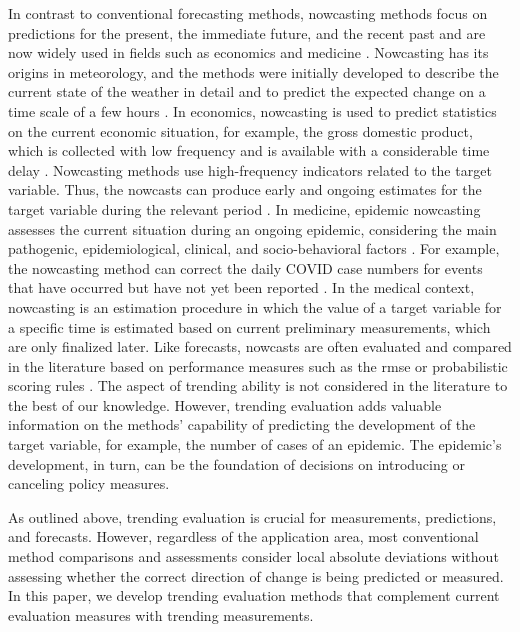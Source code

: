In contrast to conventional forecasting methods, nowcasting methods focus on predictions for the present, the immediate future, and the recent past \parencite{banbura2013now} and are now widely used in fields such as economics and medicine \parencite{bok2018macroeconomic, Wolffram2023}.
Nowcasting has its origins in meteorology, and the methods were initially developed to describe the current state of the weather in detail and to predict the expected change on a time scale of a few hours \parencite{browning1989nowcasting,schmid2019nowcasting}. 
In economics, nowcasting is used to predict statistics on the current economic situation, for example, the gross domestic product, which is collected with low frequency and is available with a considerable time delay \parencite{banbura2013now}.
Nowcasting methods use high-frequency indicators related to the target variable.
Thus, the nowcasts can produce early and ongoing estimates for the target variable during the relevant period \parencite{castle2017forecasting}. 
In medicine, epidemic nowcasting assesses the current situation during an ongoing epidemic, considering the main pathogenic, epidemiological, clinical, and socio-behavioral factors \parencite{wu2021nowcasting}. 
For example, the nowcasting method can correct the daily COVID case numbers for events that have occurred but have not yet been reported \parencite{gunther2021nowcasting}. 
In the medical context, nowcasting is an estimation procedure in which the value of a target variable for a specific time is estimated based on current preliminary measurements, which are only finalized later. 
Like forecasts, nowcasts are often evaluated and compared in the literature based on performance measures such as the \ac{rmse} \parencite{gunther2021nowcasting} or probabilistic scoring rules \parencite{Wolffram2023}. 
The aspect of trending ability is not considered in the literature to the best of our knowledge. 
However, trending evaluation adds valuable information on the methods' capability of predicting the development of the target variable, for example, the number of cases of an epidemic.
The epidemic's development, in turn, can be the foundation of decisions on introducing or canceling policy measures. 

As outlined above, trending evaluation is crucial for measurements, predictions, and forecasts. 
However, regardless of the application area, most conventional method comparisons and assessments consider local absolute deviations without assessing whether the correct direction of change is being predicted or measured. 
In this paper, we develop trending evaluation methods that complement current evaluation measures with trending measurements.

